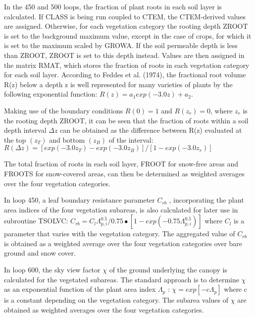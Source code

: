 In the 450 and 500 loops, the fraction of plant roots in each soil layer is calculated. If C\+L\+A\+S\+S is being run coupled to C\+T\+E\+M, the C\+T\+E\+M-\/derived values are assigned. Otherwise, for each vegetation category the rooting depth Z\+R\+O\+O\+T is set to the background maximum value, except in the case of crops, for which it is set to the maximum scaled by G\+R\+O\+W\+A. If the soil permeable depth is less than Z\+R\+O\+O\+T, Z\+R\+O\+O\+T is set to this depth instead. Values are then assigned in the matrix R\+M\+A\+T, which stores the fraction of roots in each vegetation category for each soil layer. According to Feddes et al. (1974), the fractional root volume R(z) below a depth z is well represented for many varieties of plants by the following exponential function\+: $R(z) = a_1 exp(-3.0z) + a_2.$

Making use of the boundary conditions $R(0) = 1$ and $R(z_r ) = 0$, where $z_r$ is the rooting depth Z\+R\+O\+O\+T, it can be seen that the fraction of roots within a soil depth interval $\Delta z$ can be obtained as the difference between R(z) evaluated at the top $(z_T)$ and bottom $(z_B)$ of the interval\+: $R(\Delta z) = [exp(-3.0z_T) - exp(-3.0z_B)]/ [1 - exp(-3.0z_r)]$

The total fraction of roots in each soil layer, F\+R\+O\+O\+T for snow-\/free areas and F\+R\+O\+O\+T\+S for snow-\/covered areas, can then be determined as weighted averages over the four vegetation categories.

In loop 450, a leaf boundary resistance parameter $C_{rb}$ , incorporating the plant area indices of the four vegetation subareas, is also calculated for later use in subroutine T\+S\+O\+L\+V\+C\+: $C_{rb} = C_l \Lambda_{p,i}^{0.5} /0.75 \bullet [1 - exp(-0.75 \Lambda_{p,i}^{0.5} )]$ where $C_l$ is a parameter that varies with the vegetation category. The aggregated value of $C_{rb}$ is obtained as a weighted average over the four vegetation categories over bare ground and snow cover.

In loop 600, the sky view factor $\chi$ of the ground underlying the canopy is calculated for the vegetated subareas. The standard approach is to determine $\chi$ as an exponential function of the plant area index $\Lambda_p$ \+: $\chi = exp[-c \Lambda_p ]$ where c is a constant depending on the vegetation category. The subarea values of $\chi$ are obtained as weighted averages over the four vegetation categories.

